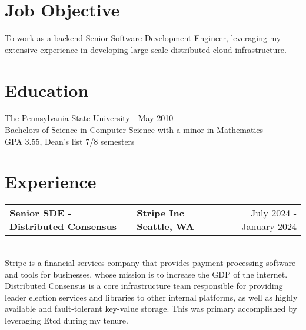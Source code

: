 \documentclass{res}
\newlength{\vsep}
\begin{document}
 


\vspace{-24pt}
\address{bennet.huber@gmail.com\\(215) 490-4297}
\address{1219 NW Richmond Beach Rd\\Shoreline, WA 98177}

\begin{resume}

\section{Job Objective}
    To work as a backend Senior Software Development Engineer, leveraging my extensive experience in developing large scale distributed cloud infrastructure.
 
\section{Education}
    The Pennsylvania State University - May 2010\\
    Bachelors of Science in Computer Science with a minor in Mathematics\\
    GPA 3.55, Dean's list 7/8 semesters

\section{Experience}
   \begin{tabularx}{\textwidth}{@{}>{\bf}l>{\large\bf\centering\arraybackslash}Xr@{}}
   Senior SDE - Distributed Consensus & Stripe Inc -- Seattle, WA & July 2024 - January 2024\vspace{\vsep}\\
   \end{tabularx}\\
   Stripe is a financial services company that provides payment processing software and tools for businesses, whose mission is to increase the GDP of the internet. Distributed Consensus is a core infrastructure team responsible for providing leader election services and libraries to other internal platforms, as well as highly available and fault-tolerant key-value storage.  This was primary accomplished by leveraging Etcd during my tenure.
   

\end{resume}
\end{document}
